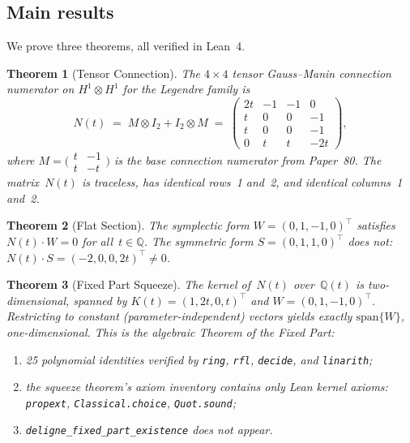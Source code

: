 \documentclass[11pt]{article}
\theoremstyle{plain}
\newtheorem{theorem}{Theorem}[section]
\theoremstyle{definition}
\theoremstyle{remark}
\newcommand{\Q}{\mathbb{Q}}
\begin{document}
\subsection{Main results}

We prove three theorems, all verified in Lean~4.

\begin{theorem}[Tensor Connection]\label{thm:A}
The $4 \times 4$ tensor Gauss--Manin connection numerator
on $H^1 \otimes H^1$ for the Legendre family is
\[
N(t) \;=\; M \otimes I_2 + I_2 \otimes M
\;=\;
\begin{pmatrix}
2t & -1 & -1 & 0 \\
t  & 0  & 0  & -1 \\
t  & 0  & 0  & -1 \\
0  & t  & t  & -2t
\end{pmatrix},
\]
where $M = \bigl(\begin{smallmatrix} t & -1 \\ t & -t
\end{smallmatrix}\bigr)$ is the base connection numerator
from Paper~80.  The matrix~$N(t)$ is traceless, has identical
rows~1 and~2, and identical columns~1 and~2.
\end{theorem}

\begin{theorem}[Flat Section]\label{thm:B}
The symplectic form $W = (0,1,-1,0)^{\!\top}$ satisfies
$N(t) \cdot W = 0$ for all~$t \in \Q$.
The symmetric form $S = (0,1,1,0)^{\!\top}$ does not:
$N(t) \cdot S = (-2, 0, 0, 2t)^{\!\top} \neq 0$.
\end{theorem}

\begin{theorem}[Fixed Part Squeeze]\label{thm:C}
The kernel of~$N(t)$ over~$\Q(t)$ is two-dimensional,
spanned by $K(t) = (1, 2t, 0, t)^{\!\top}$ and
$W = (0, 1, -1, 0)^{\!\top}$.
Restricting to constant (parameter-independent) vectors
yields exactly $\mathrm{span}\{W\}$, one-dimensional.
This is the algebraic Theorem of the Fixed Part:
\begin{enumerate}[nosep,label=\upshape(\alph*)]
\item 25 polynomial identities verified by \texttt{ring},
      \texttt{rfl}, \texttt{decide}, and \texttt{linarith};
\item the squeeze theorem's axiom inventory contains only
      Lean kernel axioms: \texttt{propext},
      \texttt{Classical.choice}, \texttt{Quot.sound};
\item \texttt{deligne\_fixed\_part\_existence}
      does \emph{not} appear.
\end{enumerate}
\end{theorem}
\end{document}
